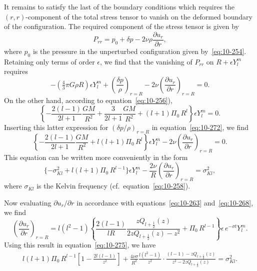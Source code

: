 It remains to satisfy the last of the boundary conditions which requires the $(r,r)$-component of the total stress tensor to vanish on the deformed boundary of the configuration. The required component of the stress tensor is given by
\begin{equation}
\label{eq:10-271}
P_{rr} = p_0+\delta p-2\nu\rho\frac{\partial u_r}{\partial r},
\end{equation}
where $p_0$ is the pressure in the unperturbed configuration given by~\eqref{eq:10-254}. Retaining only terms of order $\epsilon$, we find that the vanishing of $P_{rr}$ on $R+\epsilon Y_l^m$ requires
\begin{equation}
\label{eq:10-272}
-(\tfrac{4}{3}\pi G\rho R)\epsilon Y_l^m+\left(\frac{\delta p}{\rho}\right)_{r=R}-2\nu\!\left(\frac{\partial u_r}{\partial r}\right)_{r=R} = 0.
\end{equation}
On the other hand, according to equation~\eqref{eq:10-256}),
\begin{equation}
\label{eq:10-273}
\left\{-\frac{2(l-1)}{2l+1}\frac{GM}{R^2}+\frac{3}{2l+1}\frac{GM}{R^2}+(l+1)\Pi_0\,R^l\right\}\epsilon Y_l^m = 0.
\end{equation}
Inserting this latter expression for $(\delta p/\rho)_{r=R}$ in equation~\eqref{eq:10-272}, we find
\begin{equation}
\label{eq:10-274}
\left\{-\frac{2(l-1)}{2l+1}\frac{GM}{R^2}+l(l+1)\Pi_0\,R^l\right\}\epsilon Y_l^m - 2\nu\!\left(\frac{\partial u_r}{\partial r}\right)_{r=R} = 0.
\end{equation}
This equation can be written more conveniently in the form
\begin{equation}
\label{eq:10-275}
\{-\sigma_{Kl}^2+l(l+1)\Pi_0\,R^{l-1}\}\epsilon Y_l^m - \frac{2\nu}{R}\!\left(\frac{\partial u_r}{\partial r}\right)_{r=R} = \sigma_{Kl}^2,
\end{equation}
where $\sigma_{Kl}$ is the Kelvin frequency (cf.\ equation~\eqref{eq:10-258}).

Now evaluating $\partial u_r/\partial r$ in accordance with equations~\eqref{eq:10-263} and~\eqref{eq:10-268}, we find
\begin{equation}
\label{eq:10-276}
\left(\frac{\partial u_r}{\partial r}\right)_{r=R} = l(l^2-1)\!\left\{\frac{2(l-1)}{lR}\frac{zQ_{l+\frac{1}{2}}(z)}{2zQ_{l+\frac{1}{2}}(z)-z^2}+\Pi_0\,R^{l-1}\right\}\!\epsilon\,e^{-\sigma t}Y_l^m.
\end{equation}
Using this result in equation~\eqref{eq:10-275}, we have
\begin{align}
\label{eq:10-277}
l(l+1)\Pi_0\,R^{l-1}\!\left[1-\frac{2l(l-1)}{z^2}\right] + \frac{4\nu\sigma}{R^2}\frac{l(l^2-1)}{z^2}\cdot\frac{(l-1)-zQ_{l+\frac{1}{2}}(z)}{z^2-2zQ_{l+\frac{1}{2}}(z)} = \sigma_{Kl}^2.
\end{align}

